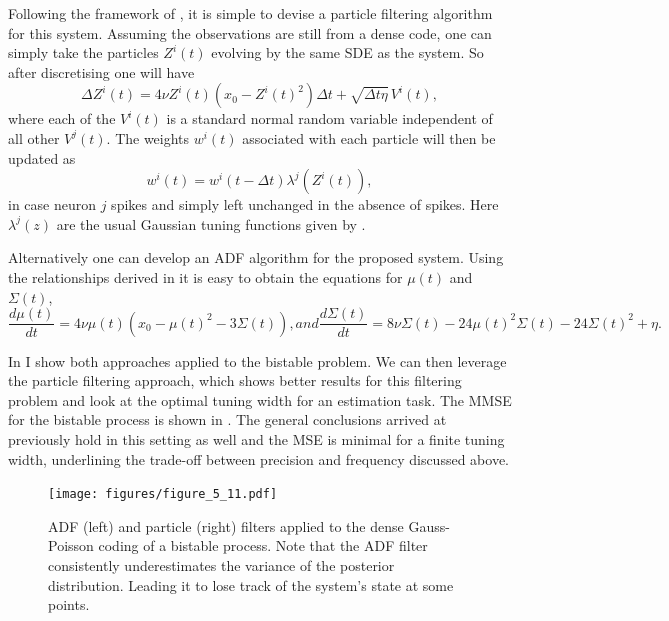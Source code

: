 Following the framework of , it is simple to devise a particle filtering algorithm for this system. Assuming the observations are still from a dense code, one can simply 
take the particles $Z^i(t)$ evolving by the same SDE as the system. So after discretising one will have
\[
\Delta Z^i(t) = 4 \nu Z^i(t) \left(x_0 - Z^i(t)^2 \right) \Delta t+ \sqrt{\Delta t \eta} \,V^i(t) ,
\]
where each of the $V^i(t)$ is a standard normal random variable independent of all other $V^j(t)$. The weights $w^i(t)$ associated with each particle will then be 
updated as 
\[
w^i(t) = w^i(t-\Delta t) \lambda^j\left(Z^i(t)\right),
\]
in case neuron $j$ spikes and simply left unchanged in the absence of spikes. Here $\lambda^j(z)$ are the usual Gaussian tuning functions given by .\par
Alternatively one can develop an ADF algorithm for the proposed system. Using the relationships derived in  it is easy to obtain the equations for $\mu(t)$ and $\Sigma(t)$,
\begin{subequations}
\begin{equation}
\frac{d\mu(t)}{dt} = 4\nu \mu(t) \left(x_0 -\mu(t)^2-3\Sigma(t)\right) ,
\end{equation}
and
\begin{equation}
\frac{d\Sigma(t)}{dt} = 8\nu \Sigma(t)-24\mu(t)^2\Sigma(t)-24\Sigma(t)^2 + \eta.
\end{equation}
\end{subequations}
\par
In  I show both approaches applied to the bistable problem. We can then leverage the particle filtering approach, which shows better results
for this filtering problem and look at the optimal tuning width for an estimation task. The MMSE for the bistable process is shown in 
. The general conclusions arrived at previously hold in this setting as well and
the MSE is minimal for a finite tuning width, underlining the trade-off between precision and frequency discussed above.

\begin{figure}
\label{fig:bistable_filt}
\texttt{[image: figures/figure\_5\_11.pdf]}
\caption[Filtering bistable processes with Point process observations.]{ADF (left) and particle (right) filters applied to the dense Gauss-Poisson coding of a bistable process. Note that the ADF filter consistently underestimates the variance
of the posterior distribution. Leading it to lose track of the system's state at some points.}
\end{figure}

